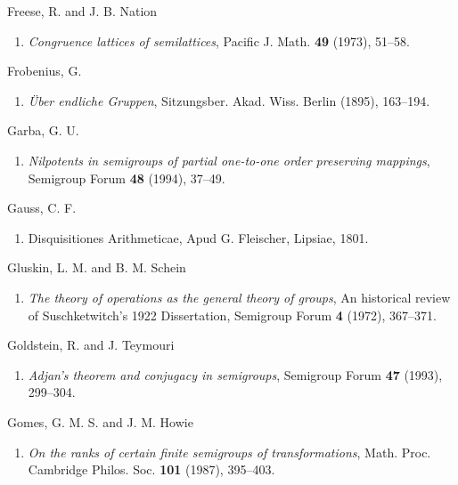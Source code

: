 \documentclass{surv-l}
\numberwithin{equation}{section}
\numberwithin{table}{section}
\numberwithin{figure}{section}
\theoremstyle{plain}
\theoremstyle{definition}
\begin{document}
\begin{thebibliography}{}
\item[] Freese, R. and J. B. Nation
\begin{enumerate}
\item \label{bib16} \emph{Congruence lattices of semilattices}, Pacific J.
Math. \textbf{49} (1973), 51--58.
\end{enumerate}

\item[] Frobenius, G.
\begin{enumerate}
\item \label{bib17} \emph{\"{U}ber endliche Gruppen}, Sitzungsber. Akad. Wiss.
Berlin (1895), 163--194.
\end{enumerate}

\item[] Garba, G. U.
\begin{enumerate}
\item \label{bib18} \emph{Nilpotents in semigroups of partial one-to-one
order preserving mappings}, Semigroup Forum \textbf{48}
(1994), 37--49.
\end{enumerate}

\item[] Gauss, C. F.
\begin{enumerate}
\item \label{bib19} Disquisitiones Arithmeticae, Apud G. Fleischer, Lipsiae,
1801.
\end{enumerate}

\item[] Gluskin, L. M. and B. M. Schein
\begin{enumerate}
\item \label{bib20} \emph{The theory of operations as the general theory
of groups}, An historical review of Suschketwitch's 1922
Dissertation, Semigroup Forum \textbf{4} (1972), 367--371.
\end{enumerate}

\item[] Goldstein, R. and J. Teymouri
\begin{enumerate}
\item \label{bib21} \emph{Adjan's theorem and conjugacy in
semigroups}, Semigroup Forum \textbf{47} (1993), 299--304.
\end{enumerate}

\item[] Gomes, G. M. S. and J. M. Howie
\begin{enumerate}
\item \label{bib22} \emph{On the ranks of certain finite semigroups of
transformations}, Math. Proc. Cambridge Philos. Soc.
\textbf{101} (1987), 395--403.


\end{enumerate}
\end{thebibliography}
\end{document}
